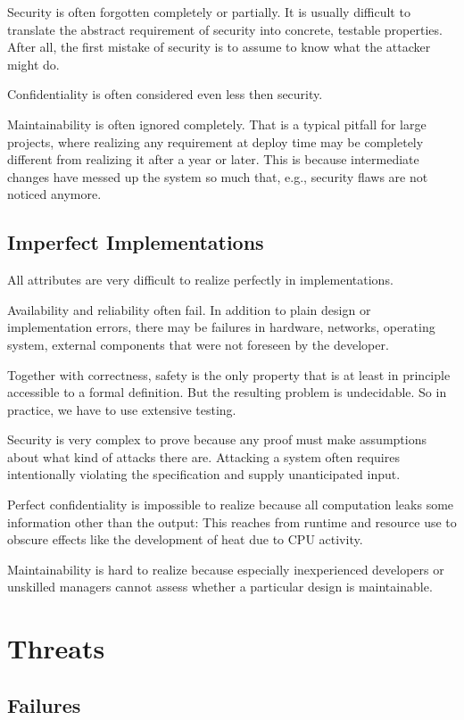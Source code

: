 Security is often forgotten completely or partially.
It is usually difficult to translate the abstract requirement of security into concrete, testable properties.
After all, the first mistake of security is to assume to know what the attacker might do.

Confidentiality is often considered even less then security.

Maintainability is often ignored completely.
That is a typical pitfall for large projects, where realizing any requirement at deploy time may be completely different from realizing it after a year or later.
This is because intermediate changes have messed up the system so much that, e.g., security flaws are not noticed anymore.

\subsection{Imperfect Implementations}

All attributes are very difficult to realize perfectly in implementations.

Availability and reliability often fail.
In addition to plain design or implementation errors, there may be failures in hardware, networks, operating system, external components that were not foreseen by the developer.

Together with correctness, safety is the only property that is at least in principle accessible to a formal definition.
But the resulting problem is undecidable.
So in practice, we have to use extensive testing.  

Security is very complex to prove because any proof must make assumptions about what kind of attacks there are.
Attacking a system often requires intentionally violating the specification and supply unanticipated input.

Perfect confidentiality is impossible to realize because all computation leaks some information other than the output: This reaches from runtime and resource use to obscure effects like the development of heat due to CPU activity.

Maintainability is hard to realize because especially inexperienced developers or unskilled managers cannot assess whether a particular design is maintainable.

\section{Threats}

\subsection{Failures}

